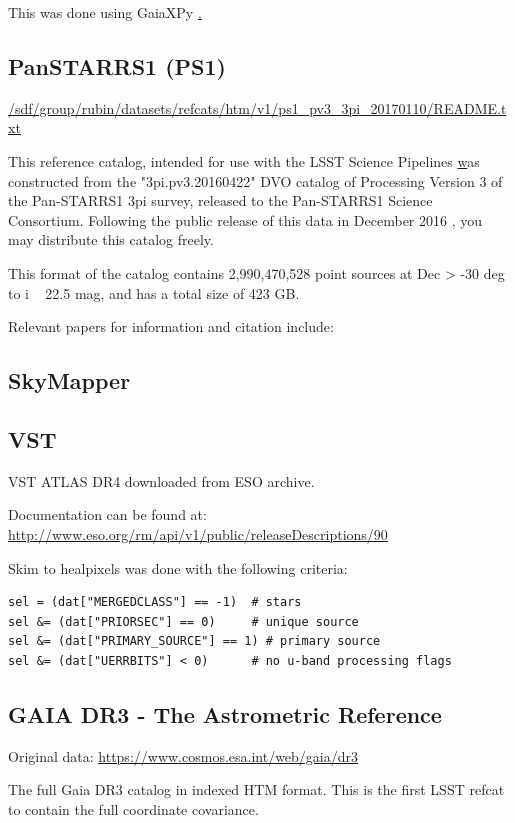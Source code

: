 This was done using GaiaXPy \href{https://github.com/gaia-dpci/GaiaXPy/cd}.

\subsection{PanSTARRS1 (PS1)}
\label{sec:ps1}
\url{/sdf/group/rubin/datasets/refcats/htm/v1/ps1_pv3_3pi_20170110/README.txt}

This reference catalog, intended for use with the LSST Science Pipelines \href{https://pipelines.lsst.io} was constructed from the "3pi.pv3.20160422" DVO catalog of Processing Version 3 of the Pan-STARRS1 3pi survey, released to the Pan-STARRS1 Science Consortium. Following the public release of this data in December 2016 \href{http://panstarrs.stsci.edu}, you may distribute this catalog freely.

This format of the catalog contains 2,990,470,528 point sources at Dec > -30 deg to i ~ 22.5 mag, and has a total size of 423 GB. 

Relevant papers for information and citation include: \citet{Chambers:2016}

\subsection{SkyMapper}
\label{sec:skymapper}
\subsection{VST}
\label{sec:vst}

VST ATLAS DR4 downloaded from ESO archive.

Documentation can be found at: \url{http://www.eso.org/rm/api/v1/public/releaseDescriptions/90}

Skim to healpixels was done with the following criteria:
\begin{verbatim}
sel = (dat["MERGEDCLASS"] == -1)  # stars
sel &= (dat["PRIORSEC"] == 0)     # unique source 
sel &= (dat["PRIMARY_SOURCE"] == 1) # primary source 
sel &= (dat["UERRBITS"] < 0)      # no u-band processing flags
\end{verbatim}

\subsection{GAIA DR3 - The Astrometric Reference}
\label{sec:gaiadr3}
Original data: \url{https://www.cosmos.esa.int/web/gaia/dr3}

The full Gaia DR3 catalog in indexed HTM format. 
This is the first LSST refcat to contain the full coordinate covariance.

